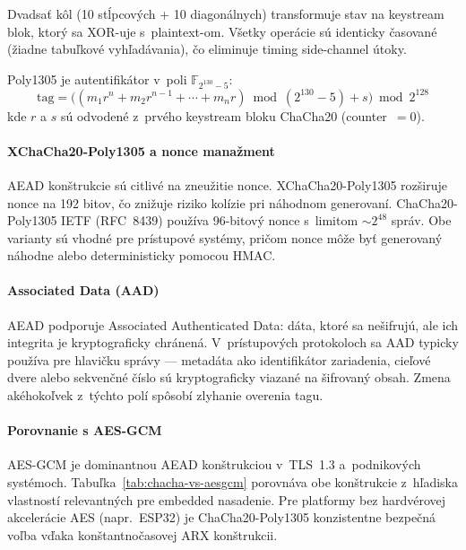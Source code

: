 Dvadsať kôl (10 stĺpcových + 10 diagonálnych) transformuje stav na keystream blok, ktorý sa XOR-uje s~plaintext-om. Všetky operácie sú identicky časované (žiadne tabuľkové vyhľadávania), čo eliminuje timing side-channel útoky\cite{Bernstein2012}.

Poly1305 je autentifikátor v~poli $\mathbb{F}_{2^{130}-5}$:
\begin{equation}
\text{tag} = \bigl((m_1 r^n + m_2 r^{n-1} + \cdots + m_n r) \bmod (2^{130}-5) + s\bigr) \bmod 2^{128}
\end{equation}
kde $r$ a $s$ sú odvodené z~prvého keystream bloku ChaCha20 (counter~$= 0$)\cite{RFC8439}.

\paragraph{XChaCha20-Poly1305 a nonce manažment}

AEAD konštrukcie sú citlivé na zneužitie nonce. XChaCha20-Poly1305 rozširuje nonce na 192 bitov, čo znižuje riziko kolízie pri náhodnom generovaní\cite{XChaChaDraft,LibsodiumXChaChaDoc}. ChaCha20-Poly1305 IETF (RFC~8439) používa 96-bitový nonce s~limitom ${\sim}2^{48}$ správ. Obe varianty sú vhodné pre prístupové systémy, pričom nonce môže byť generovaný náhodne alebo deterministicky pomocou HMAC.

\paragraph{Associated Data (AAD)}

AEAD podporuje Associated Authenticated Data: dáta, ktoré sa nešifrujú, ale ich integrita je kryptograficky chránená. V~prístupových protokoloch sa AAD typicky používa pre hlavičku správy --- metadáta ako identifikátor zariadenia, cieľové dvere alebo sekvenčné číslo sú kryptograficky viazané na šifrovaný obsah. Zmena akéhokoľvek z~týchto polí spôsobí zlyhanie overenia tagu.

\paragraph{Porovnanie s AES-GCM}

AES-GCM je dominantnou AEAD konštrukciou v~TLS~1.3 a~podnikových systémoch. Tabuľka~\ref{tab:chacha-vs-aesgcm} porovnáva obe konštrukcie z~hľadiska vlastností relevantných pre embedded nasadenie. Pre platformy bez hardvérovej akcelerácie AES (napr.~ESP32\cite{Espressif2024}) je ChaCha20-Poly1305 konzistentne bezpečná voľba vďaka konštantnočasovej ARX konštrukcii\cite{Bernstein2012}.

